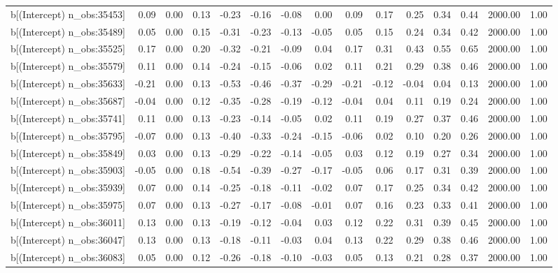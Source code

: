 \begin{table}[ht]
\begin{tabular}{rrrrrrrrrrrrrrr}
  b[(Intercept) n\_obs:35453] & 0.09 & 0.00 & 0.13 & -0.23 & -0.16 & -0.08 & 0.00 & 0.09 & 0.17 & 0.25 & 0.34 & 0.44 & 2000.00 & 1.00 \\ 
  b[(Intercept) n\_obs:35489] & 0.05 & 0.00 & 0.15 & -0.31 & -0.23 & -0.13 & -0.05 & 0.05 & 0.15 & 0.24 & 0.34 & 0.42 & 2000.00 & 1.00 \\ 
  b[(Intercept) n\_obs:35525] & 0.17 & 0.00 & 0.20 & -0.32 & -0.21 & -0.09 & 0.04 & 0.17 & 0.31 & 0.43 & 0.55 & 0.65 & 2000.00 & 1.00 \\ 
  b[(Intercept) n\_obs:35579] & 0.11 & 0.00 & 0.14 & -0.24 & -0.15 & -0.06 & 0.02 & 0.11 & 0.21 & 0.29 & 0.38 & 0.46 & 2000.00 & 1.00 \\ 
  b[(Intercept) n\_obs:35633] & -0.21 & 0.00 & 0.13 & -0.53 & -0.46 & -0.37 & -0.29 & -0.21 & -0.12 & -0.04 & 0.04 & 0.13 & 2000.00 & 1.00 \\ 
  b[(Intercept) n\_obs:35687] & -0.04 & 0.00 & 0.12 & -0.35 & -0.28 & -0.19 & -0.12 & -0.04 & 0.04 & 0.11 & 0.19 & 0.24 & 2000.00 & 1.00 \\ 
  b[(Intercept) n\_obs:35741] & 0.11 & 0.00 & 0.13 & -0.23 & -0.14 & -0.05 & 0.02 & 0.11 & 0.19 & 0.27 & 0.37 & 0.46 & 2000.00 & 1.00 \\ 
  b[(Intercept) n\_obs:35795] & -0.07 & 0.00 & 0.13 & -0.40 & -0.33 & -0.24 & -0.15 & -0.06 & 0.02 & 0.10 & 0.20 & 0.26 & 2000.00 & 1.00 \\ 
  b[(Intercept) n\_obs:35849] & 0.03 & 0.00 & 0.13 & -0.29 & -0.22 & -0.14 & -0.05 & 0.03 & 0.12 & 0.19 & 0.27 & 0.34 & 2000.00 & 1.00 \\ 
  b[(Intercept) n\_obs:35903] & -0.05 & 0.00 & 0.18 & -0.54 & -0.39 & -0.27 & -0.17 & -0.05 & 0.06 & 0.17 & 0.31 & 0.39 & 2000.00 & 1.00 \\ 
  b[(Intercept) n\_obs:35939] & 0.07 & 0.00 & 0.14 & -0.25 & -0.18 & -0.11 & -0.02 & 0.07 & 0.17 & 0.25 & 0.34 & 0.42 & 2000.00 & 1.00 \\ 
  b[(Intercept) n\_obs:35975] & 0.07 & 0.00 & 0.13 & -0.27 & -0.17 & -0.08 & -0.01 & 0.07 & 0.16 & 0.23 & 0.33 & 0.41 & 2000.00 & 1.00 \\ 
  b[(Intercept) n\_obs:36011] & 0.13 & 0.00 & 0.13 & -0.19 & -0.12 & -0.04 & 0.03 & 0.12 & 0.22 & 0.31 & 0.39 & 0.45 & 2000.00 & 1.00 \\ 
  b[(Intercept) n\_obs:36047] & 0.13 & 0.00 & 0.13 & -0.18 & -0.11 & -0.03 & 0.04 & 0.13 & 0.22 & 0.29 & 0.38 & 0.46 & 2000.00 & 1.00 \\ 
  b[(Intercept) n\_obs:36083] & 0.05 & 0.00 & 0.12 & -0.26 & -0.18 & -0.10 & -0.03 & 0.05 & 0.13 & 0.21 & 0.28 & 0.37 & 2000.00 & 1.00 \\ 

\end{tabular}
\end{table}
